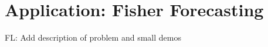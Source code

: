 \documentclass[twocolumn,twocolappendix,nofootinbib,iop]{openjournal}
\newcommand{\FrL}[1]{{\color{cyan}FL: #1}}
\begin{document}
\section{Application: Fisher Forecasting}
\label{sec-fisher-forecast}

\FrL{Add description of problem and small demos}


\end{document}

